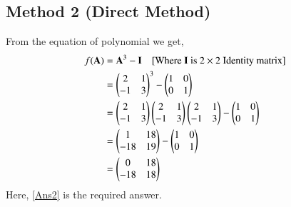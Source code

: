 \documentclass[journal,12pt,twocolumn]{IEEEtran}
\begin{document}
\subsection{Method 2 (Direct Method)}
From the equation of polynomial we get,
\begin{align}
f(\mathbf{A}) &= \mathbf{A}^3 - \mathbf{I} \quad{\text{[Where $\mathbf{I}$ is $2 \times 2$ Identity matrix]}}\\
&= \begin{pmatrix}2&1\\-1&3\end{pmatrix}^3 - \begin{pmatrix}1&0\\0&1\end{pmatrix}\\
&= \begin{pmatrix}2&1\\-1&3\end{pmatrix}\begin{pmatrix}2&1\\-1&3\end{pmatrix}\begin{pmatrix}2&1\\-1&3\end{pmatrix} - \begin{pmatrix}1&0\\0&1\end{pmatrix}\\
&= \begin{pmatrix}1&18\\-18&19\end{pmatrix} - \begin{pmatrix}1&0\\0&1\end{pmatrix}\\ 
&= \begin{pmatrix}0&18\\-18&18\end{pmatrix}\label{Ans2}
\end{align}
Here, \eqref{Ans2} is the required answer.
\end{document}
